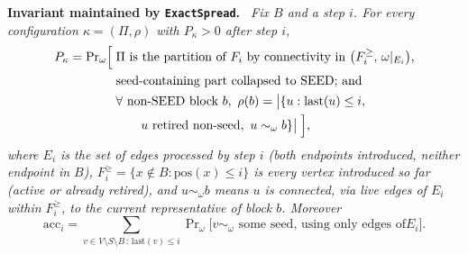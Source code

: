 \documentclass[ASNA,number]{USG}
\newenvironment{repeatlemma}[1][]{\par\medskip\noindent\textbf{#1.}\ \itshape}{\par\medskip}
\begin{document}
\begin{repeatlemma}[Invariant maintained by \texttt{ExactSpread}]\label{ec:lem:invariant}
Fix $B$ and a step $i$. For every configuration $\kappa=(\Pi,\rho)$ with
$P_\kappa>0$ after step $i$,
\begin{align*}
P_\kappa=\Pr\nolimits_\omega\Bigl[\;&\Pi\text{ is the partition of }F_i\text{
by connectivity in }\bigl(F_i^{\ge},\,\omega|_{E_i}\bigr),\\
&\text{seed-containing part collapsed to SEED; and}\\
&\forall\text{ non-SEED block }b,\ \rho(b)=\bigl|
\{u:\mathrm{last}(u)\le i,\\
&\qquad u\text{ retired non-seed},\ u\sim_\omega b\}
\bigr|\;\Bigr],
\end{align*}
where $E_i$ is the set of edges processed by step $i$ (both endpoints
introduced, neither endpoint in $B$), $F_i^{\ge}=\{x\notin B:\mathrm{pos}(x)
\le i\}$ is every vertex introduced so far (active or already retired), and
$u\sim_\omega b$ means $u$ is connected, via live edges of $E_i$ within
$F_i^{\ge}$, to the current representative of block $b$. Moreover
$$\mathrm{acc}_i=\sum_{v\in V\setminus S\setminus B\,:\,\mathrm{last}(v)\le
i}\Pr\nolimits_\omega\bigl[v\sim_\omega\text{ some seed, using only edges of
}E_i\bigr].$$
\end{repeatlemma}
\end{document}

